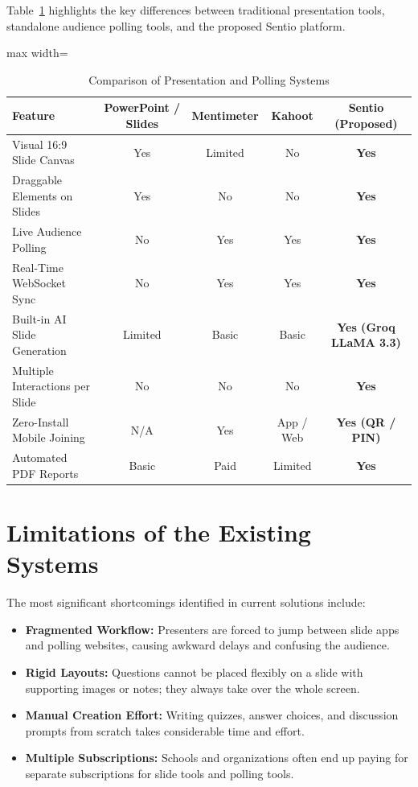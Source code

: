 Table~\ref{tab:comparison} highlights the key differences between traditional presentation tools, standalone audience polling tools, and the proposed Sentio platform.

\begin{table}[H]
\centering
\caption{Comparison of Presentation and Polling Systems}
\label{tab:comparison}
\begin{adjustbox}{max width=\textwidth}
\begin{tabular}{lcccc}
\toprule
\textbf{Feature} & \textbf{PowerPoint / Slides} & \textbf{Mentimeter} & \textbf{Kahoot} & \textbf{Sentio (Proposed)} \\
\midrule
Visual 16:9 Slide Canvas & Yes & Limited & No & \textbf{Yes} \\
Draggable Elements on Slides & Yes & No & No & \textbf{Yes} \\
Live Audience Polling & No & Yes & Yes & \textbf{Yes} \\
Real-Time WebSocket Sync & No & Yes & Yes & \textbf{Yes} \\
Built-in AI Slide Generation & Limited & Basic & Basic & \textbf{Yes (Groq LLaMA 3.3)} \\
Multiple Interactions per Slide & No & No & No & \textbf{Yes} \\
Zero-Install Mobile Joining & N/A & Yes & App / Web & \textbf{Yes (QR / PIN)} \\
Automated PDF Reports & Basic & Paid & Limited & \textbf{Yes} \\
\bottomrule
\end{tabular}
\end{adjustbox}
\end{table}

\section{Limitations of the Existing Systems}

The most significant shortcomings identified in current solutions include:

\begin{itemize}
    \item \textbf{Fragmented Workflow:} Presenters are forced to jump between slide apps and polling websites, causing awkward delays and confusing the audience.
    \item \textbf{Rigid Layouts:} Questions cannot be placed flexibly on a slide with supporting images or notes; they always take over the whole screen.
    \item \textbf{Manual Creation Effort:} Writing quizzes, answer choices, and discussion prompts from scratch takes considerable time and effort.
    \item \textbf{Multiple Subscriptions:} Schools and organizations often end up paying for separate subscriptions for slide tools and polling tools.
\end{itemize}

